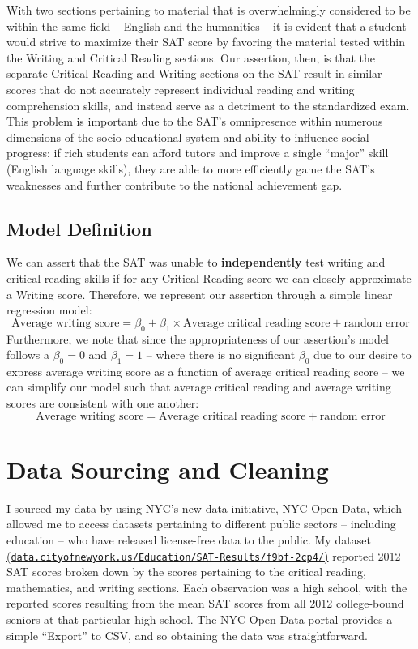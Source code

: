 \documentclass[11pt]{article} %
\begin{document}
With two sections pertaining to material that is overwhelmingly considered to be within the same field -- English and the humanities -- it is evident that a student would strive to maximize their SAT score by favoring the material tested within the Writing and Critical Reading sections. Our assertion, then, is that the separate Critical Reading and Writing sections on the SAT result in similar scores that do not accurately represent individual reading and writing comprehension skills, and instead serve as a detriment to the standardized exam. This problem is important due to the SAT's omnipresence within numerous dimensions of the socio-educational system and ability to influence social progress: if rich students can afford tutors and improve a single ``major'' skill (English language skills), they are able to more efficiently game the SAT's weaknesses and further contribute to the national achievement gap.

\subsection*{Model Definition}
We can assert that the SAT was unable to \textbf{independently} test writing and critical reading skills if for any Critical Reading score we can closely approximate a Writing score. Therefore, we represent our assertion through a simple linear regression model:
\[ \text{Average writing score} =  \beta_0 + \beta_1 \times \text{Average critical reading score} + \text{random error} \]
Furthermore, we note that since the appropriateness of our assertion's model follows a $\beta_0 = 0$ and $\beta_1 = 1$ -- where there is no significant $\beta_0$ due to our desire to express average writing score as a function of average critical reading score -- we can simplify our model such that average critical reading and average writing scores are consistent with one another:
\[ \text{Average writing score} = \text{Average critical reading score} + \text{random error} \]

\section*{Data Sourcing and Cleaning}
I sourced my data by using NYC's new data initiative, NYC Open Data, which allowed me to access datasets pertaining to different public sectors -- including education -- who have released license-free data to the public. My dataset \href{https://data.cityofnewyork.us/Education/SAT-Results/f9bf-2cp4/}{(\texttt{data.cityofnewyork.us/Education/SAT-Results/f9bf-2cp4/})} reported 2012 SAT scores broken down by the scores pertaining to the critical reading, mathematics, and writing sections. Each observation was a high school, with the reported scores resulting from the mean SAT scores from all 2012 college-bound seniors at that particular high school. The NYC Open Data portal provides a simple ``Export'' to CSV, and so obtaining the data was straightforward.
\end{document}
